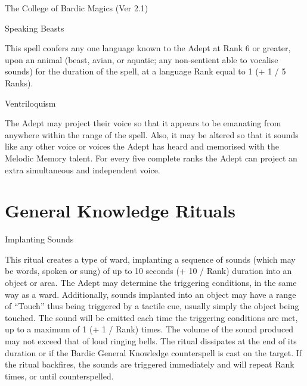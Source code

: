 \begin{Chapter}{The College of Bardic Magics (Ver 2.1)}
\begin{spell}[G-10]{Speaking Beasts}
\begin{effects}
This spell confers any one language known to the Adept at Rank 6 or
greater, upon an animal (beast, avian, or aquatic; any non-sentient
able to vocalise sounds) for the duration of the spell, at a language
Rank equal to 1 (+ 1 / 5 Ranks).
\end{effects}
\end{spell}

\begin{spell}[G-10]{Ventriloquism}

\begin{effects}
The Adept may project their voice so that it appears to be emanating
from anywhere within the range of the spell.  Also, it may be altered
so that it sounds like any other voice or voices the Adept has heard
and memorised with the Melodic Memory talent.  For every five complete
ranks the Adept can project an extra simultaneous and independent
voice.
\end{effects}
\end{spell}


\section{General Knowledge Rituals}

\begin{ritual}[Q-1]{Implanting Sounds}

\begin{effects}
This ritual creates a type of ward, implanting a sequence of sounds
(which may be words, spoken or sung) of up to 10 seconds (+ 10 / Rank)
duration into an object or area.  The Adept may determine the
triggering conditions, in the same way as a ward. Additionally, sounds
implanted into an object may have a range of “Touch” thus being
triggered by a tactile cue, usually simply the object being touched.
The sound will be emitted each time the triggering conditions are met,
up to a maximum of 1 (+ 1 / Rank) times.  The volume of the sound
produced may not exceed that of loud ringing bells. The ritual
dissipates at the end of its duration or if the Bardic General
Knowledge counterspell is cast on the target.  If the ritual
backfires, the sounds are triggered immediately and will repeat Rank
times, or until counterspelled.
\end{effects}
\end{ritual}


\end{Chapter}
